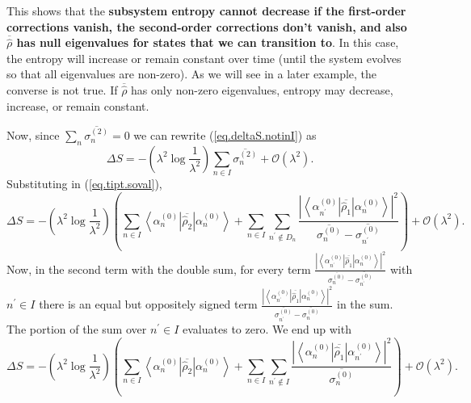 \documentclass[11pt]{article}
\newcommand{\Od}[1]{\mathcal{O}{\left(#1\right)}}
\newcommand{\bra}[1]{\left\langle#1\right|}
\newcommand{\ket}[1]{\left|#1\right\rangle}
\newcommand{\op}[1]{\hat{#1}}
\theoremstyle{theorem}
\theoremstyle{remark}
\theoremstyle{step}
\theoremstyle{gap}
\begin{document}
This shows that the {\bf subsystem entropy cannot decrease if the first-order corrections vanish, the second-order corrections don't vanish, and also \(\overline{\op{\rho}}\) has null eigenvalues for states that we can transition to}. In this case, the entropy will increase or remain constant over time (until the system evolves so that all eigenvalues are non-zero). As we will see in a later example, the converse is not true. If \(\overline{\op{\rho}}\) has only non-zero eigenvalues, entropy may decrease, increase, or remain constant.

Now, since \(\sum_{n} \overline{\sigma_n^{(2)}}= 0\) we can rewrite (\ref{eq.deltaS.notinI}) as
\begin{equation}\label{eq.deltaS}
\Delta S = -\left(\lambda^2\log\frac{1}{\lambda^{2}} \right)\sum_{n \in I} \overline{\sigma_n^{(2)}} + \Od{\lambda^2}.
\end{equation}
Substituting in (\ref{eq.tipt.soval}),
\[
\Delta S = -\left(\lambda^2 \log\frac{1}{\lambda^2}\right)\left(\sum_{n \in I} \bra{\alpha_n^{(0)}}\overline{\op{\rho}_2}\ket{\alpha_n^{(0)}} +  \sum_{n \in I} \sum_{{n^\prime} \not\in D_n} \frac{\left|\bra{\alpha_{n^\prime}^{(0)}} \overline{\op{\rho}_1} \ket{\alpha_n^{(0)}}\right|^2}{\overline{\sigma_n^{(0)}}-\overline{\sigma_{n^\prime}^{(0)}}} \right)+ \Od{\lambda^2}.
\]
Now, in the second term with the double sum, for every term \(\frac{\left|\bra{\alpha_{n^\prime}^{(0)}} \overline{\op{\rho}_1} \ket{\alpha_n^{(0)}}\right|^2}{\overline{\sigma_n^{(0)}}-\overline{\sigma_{n^\prime}^{(0)}}}\) with \(n^\prime \in I\) there is an equal but oppositely signed term \(\frac{\left|\bra{\alpha_{n^\prime}^{(0)}} \overline{\op{\rho}_1} \ket{\alpha_n^{(0)}}\right|^2}{\overline{\sigma_{n^\prime}^{(0)}}-\overline{\sigma_n^{(0)}}}\) in the sum. The portion of the sum over \(n^\prime \in I\) evaluates to zero. We end up with
\begin{equation}\label{eq.deltaSso.intermediate}
\Delta S = -\left(\lambda^2 \log\frac{1}{\lambda^2}\right)\left(\sum_{n \in I} \bra{\alpha_n^{(0)}}\overline{\op{\rho}_2}\ket{\alpha_n^{(0)}} +  \sum_{n \in I} \sum_{n^\prime \not\in I} \frac{\left|\bra{\alpha_{n}^{(0)}} \overline{\op{\rho}_1} \ket{\alpha_{n^\prime}^{(0)}}\right|^2}{\overline{\sigma_n^{(0)}}} \right)+ \Od{\lambda^2}.
\end{equation}
\end{document}

